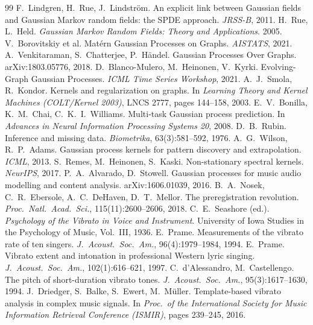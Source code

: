 \begin{thebibliography}{99}
 F.~Lindgren, H.~Rue, J.~Lindstr\"om.
  An explicit link between Gaussian fields and Gaussian Markov random fields:
  the SPDE approach. \emph{JRSS-B}, 2011.
 H.~Rue, L.~Held.
  \emph{Gaussian Markov Random Fields: Theory and Applications}. 2005.
 V.~Borovitskiy et al.
  Mat\'ern Gaussian Processes on Graphs. \emph{AISTATS}, 2021.
 A.~Venkitaraman, S.~Chatterjee, P.~H\"andel.
  Gaussian Processes Over Graphs. arXiv:1803.05776, 2018.
 D.~Blanco-Mulero, M.~Heinonen, V.~Kyrki.
  Evolving-Graph Gaussian Processes. \emph{ICML Time Series Workshop}, 2021.
 A.~J.~Smola, R.~Kondor.
Kernels and regularization on graphs.
In \emph{Learning Theory and Kernel Machines (COLT/Kernel 2003)}, LNCS 2777,
pages 144--158, 2003.
 E.~V.~Bonilla, K.~M.~Chai, C.~K.~I.~Williams.
Multi-task Gaussian process prediction.
In \emph{Advances in Neural Information Processing Systems 20}, 2008.
 D.~B.~Rubin.
Inference and missing data.
\emph{Biometrika}, 63(3):581--592, 1976.
 A.~G.~Wilson, R.~P.~Adams.
Gaussian process kernels for pattern discovery and extrapolation.
\emph{ICML}, 2013.
 S.~Remes, M.~Heinonen, S.~Kaski.
Non-stationary spectral kernels. \emph{NeurIPS}, 2017.
 P.~A.~Alvarado, D.~Stowell.
Gaussian processes for music audio modelling and content analysis.
arXiv:1606.01039, 2016.
 B.~A.~Nosek, C.~R.~Ebersole, A.~C.~DeHaven, D.~T.~Mellor.
The preregistration revolution.
\emph{Proc.\ Natl.\ Acad.\ Sci.}, 115(11):2600--2606, 2018.
 C.~E.~Seashore (ed.).
\emph{Psychology of the Vibrato in Voice and Instrument}.
University of Iowa Studies in the Psychology of Music, Vol.~III, 1936.
 E.~Prame.
Measurements of the vibrato rate of ten singers.
\emph{J.\ Acoust.\ Soc.\ Am.}, 96(4):1979--1984, 1994.
 E.~Prame.
Vibrato extent and intonation in professional Western lyric singing.
\emph{J.\ Acoust.\ Soc.\ Am.}, 102(1):616--621, 1997.
 C.~d'Alessandro, M.~Castellengo.
The pitch of short-duration vibrato tones.
\emph{J.\ Acoust.\ Soc.\ Am.}, 95(3):1617--1630, 1994.
 J.~Driedger, S.~Balke, S.~Ewert, M.~M\"uller.
Template-based vibrato analysis in complex music signals.
In \emph{Proc.\ of the International Society for Music Information Retrieval
Conference (ISMIR)}, pages 239--245, 2016.

\end{thebibliography}
